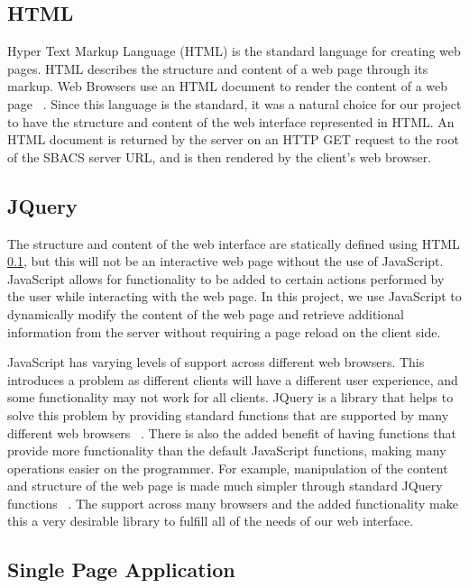 \documentclass[12pt]{report}
\let\Oldsubsection\subsection
\renewcommand{\subsection}{\FloatBarrier\Oldsubsection}
\begin{document}
\subsection{HTML} \label{html}


Hyper Text Markup Language (HTML) is the standard language for creating web pages. HTML describes the
structure and content of a web page through its markup. Web Browsers use an HTML document to render
the content of a web page ~\autocite{HTMLREF}. Since this language is the standard, it was a natural choice for our
project to have the structure and content of the web interface represented in HTML. An HTML document
is returned by the server on an HTTP GET request to the root of the SBACS server URL, and is then
rendered by the client's web browser.

\subsection{JQuery} \label{jquery}

The structure and content of the web interface are statically defined using HTML \ref{html}, but this will not
be an interactive web page without the use of JavaScript. JavaScript allows for functionality to be
added to certain actions performed by the user while interacting with the web page. In this project,
we use JavaScript to dynamically modify the content of the web page and retrieve additional
information from the server without requiring a page reload on the client side.

JavaScript has varying levels of support across different web browsers. This introduces a problem as
different clients will have a different user experience, and some functionality may not work for
all clients. JQuery is a library that helps to solve this problem by providing standard functions that
are supported by many different web browsers ~\autocite{JQUERYSUPPORT}. There is also the added benefit
of having functions that
provide more functionality than the default JavaScript functions, making many operations easier on the
programmer. For example, manipulation of the content and structure of the web page is made much simpler through
standard JQuery functions ~\autocite{JQUERYREF}. The support across many browsers and the added functionality make this a
very desirable library to fulfill all of the needs of our web interface.

\subsection{Single Page Application} \label{single-page-application}
\end{document}
